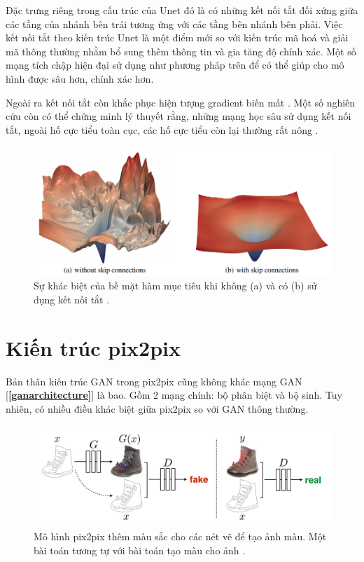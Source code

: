 \documentclass[a4paper, 12pt]{report}
\begin{document}
Đặc trưng riêng trong cấu trúc của Unet đó là có những kết nối tắt đối xứng giữa các tầng của nhánh bên trái tương ứng với các tầng bên nhánh bên phải.
Việc kết nối tắt theo kiến trúc Unet là một điểm mới so với kiến trúc mã hoá và giải mã thông thường nhằm bổ sung thêm thông tin và gia tăng độ chính xác.
Một số mạng tích chập hiện đại sử dụng như phương pháp trên \cite{he2015deep, huang2018densely} để có thể giúp cho mô hình được sâu hơn, chính xác hơn.\vspace{5pt}

Ngoài ra kết nối tắt còn khắc phục hiện tượng gradient biến mất \cite{adaloglou2020skip}.
Một số nghiên cứu còn có thể chứng minh lý thuyết rằng, những mạng học sâu sử dụng kết nối tắt, ngoài hố cực tiểu toàn cục, các hố cực tiểu còn lại thường rất nông \cite{wang2020skip}.

\begin{figure}[!h]
\captionsetup{width=0.8\textwidth}
\centering
\includegraphics[width=15cm]{images/objwithskip.png}
\caption{Sự khác biệt của bề mặt hàm mục tiêu khi không (a) và có (b) sử dụng kết nối tắt \cite{li2018visualizing}.}
\end{figure}

\section{Kiến trúc pix2pix}\label{pix2pixarchitecture}

Bản thân kiến trúc GAN trong pix2pix cũng không khác mạng GAN [\textbf{\ref{ganarchitecture}}] là bao.
Gồm 2 mạng chính: bộ phân biệt và bộ sinh.
Tuy nhiên, có nhiều điều khác biệt giữa pix2pix so với GAN thông thường.

\begin{figure}[!h]
\captionsetup{width=0.8\textwidth}
\centering
\includegraphics[width=17cm]{images/2_9.PNG}
\caption{Mô hình pix2pix thêm màu sắc cho các nét vẽ để tạo ảnh màu. Một bài toán tương tự với bài toán tạo màu cho ảnh \cite{isola2018imagetoimage}.}
\label{fig:pix2pixarchitecture}
\end{figure}
\end{document}
